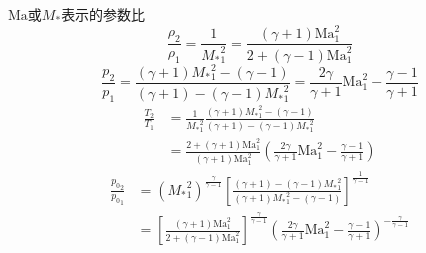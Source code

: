 \begin{frame}{$\mathrm{Ma}$或$M_{*}$表示的参数比}
  \vspace*{-1em}
\begin{equation*}
   \frac{\rho_{2}}{\rho_{1}}
   =
   \frac{1}{{M_{*}}_{1}^{2}}
   =
   \frac{(\gamma+1)\mathrm{Ma}_{1}^{2}}{2+(\gamma-1)\mathrm{Ma}_{1}^{2}}
 \end{equation*}
\begin{equation*}
   \frac{p_{2}}{p_{1}}
   =
   \frac{(\gamma+1){M_{*}}_{1}^{2}-(\gamma-1)}{(\gamma+1)-(\gamma-1){M_{*}}_{1}^{2}}
   =
   \frac{2\gamma}{\gamma+1}\mathrm{Ma}_{1}^{2}
   -
   \frac{\gamma-1}{\gamma+1}
 \end{equation*}
  \begin{equation*}
    \begin{aligned}
    \frac{T_{2}}{T_{1}}
    &=
    \frac{1}{{M_{*}}_{1}^{2}}
    \frac{(\gamma+1){M_{*}}_{1}^{2}-(\gamma-1)}{(\gamma+1)-(\gamma-1){M_{*}}_{1}^{2}}
    \\
    &=
    \frac{2+(\gamma+1)\mathrm{Ma}_{1}^{2}}{(\gamma+1)\mathrm{Ma}_{1}^{2}}
    \left(
   \frac{2\gamma}{\gamma+1}\mathrm{Ma}_{1}^{2}
   -
   \frac{\gamma-1}{\gamma+1}
    \right)
    \end{aligned}
  \end{equation*}
  \begin{equation*}
    \begin{aligned}
    \frac{{p_{0}}_{2}}{{p_{0}}_{1}}
    &=
    ({M_{*}}_{1}^{2})^{\frac{\gamma}{\gamma-1}}
    \left[\frac{(\gamma+1)-(\gamma-1){M_{*}}_{1}^{2}}{(\gamma+1){M_{*}}_{1}^{2}-(\gamma-1)}\right]^{\frac{1}{\gamma-1}}
    \\
    &=
    \left[\frac{(\gamma+1)\mathrm{Ma}_{1}^{2}}{2+(\gamma-1)\mathrm{Ma}_{1}^{2}} \right]^{\frac{\gamma}{\gamma-1}}
    \left(\frac{2\gamma}{\gamma+1}\mathrm{Ma}_{1}^{2}-\frac{\gamma-1}{\gamma+1}\right)^{-\frac{\gamma}{\gamma-1}}
    \end{aligned}
  \end{equation*}
\end{frame}

